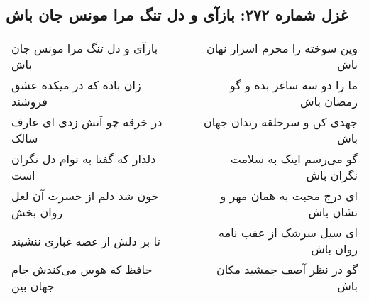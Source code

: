 \begin{center}
\section*{غزل شماره ۲۷۲: بازآی و دل تنگ مرا مونس جان باش}
\label{sec:sh272}
\begin{longtable}{l p{0.5cm} r}
بازآی و دل تنگ مرا مونس جان باش
&&
وین سوخته را محرم اسرار نهان باش
\\
زان باده که در میکده عشق فروشند
&&
ما را دو سه ساغر بده و گو رمضان باش
\\
در خرقه چو آتش زدی ای عارف سالک
&&
جهدی کن و سرحلقه رندان جهان باش
\\
دلدار که گفتا به توام دل نگران است
&&
گو می‌رسم اینک به سلامت نگران باش
\\
خون شد دلم از حسرت آن لعل روان بخش
&&
ای درج محبت به همان مهر و نشان باش
\\
تا بر دلش از غصه غباری ننشیند
&&
ای سیل سرشک از عقب نامه روان باش
\\
حافظ که هوس می‌کندش جام جهان بین
&&
گو در نظر آصف جمشید مکان باش
\\
\end{longtable}
\end{center}

